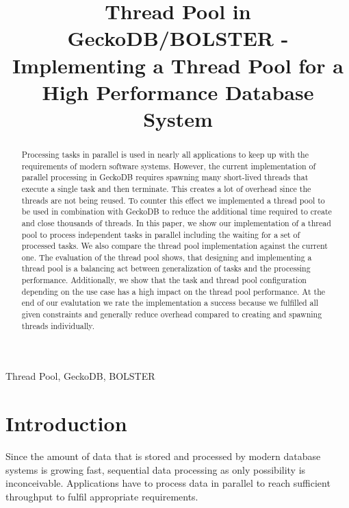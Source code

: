 \documentclass[conference]{IEEEtran}
\begin{document}
\title{Thread Pool in GeckoDB/BOLSTER - Implementing a Thread Pool for a High Performance Database System \\
}

\author{
	 \and
}

\maketitle

\begin{abstract}
        Processing tasks in parallel is used in nearly all applications to keep
        up with the requirements of modern software systems. However, the
        current implementation of parallel processing in GeckoDB requires
        spawning many short-lived threads that execute a single task and then
        terminate. This creates a lot of overhead since the threads are not
        being reused. To counter this effect we implemented a thread pool to be
        used in combination with GeckoDB to reduce the additional time required
        to create and close thousands of threads. In this paper, we show our
        implementation of a thread pool to process independent tasks in parallel
        including the waiting for a set of processed tasks. We also compare the
        thread pool implementation against the current one. The evaluation of
        the thread pool shows, that designing and implementing a thread pool is
        a balancing act between generalization of tasks and the processing
        performance. Additionally, we show that the task and thread pool configuration
        depending on the use case has a high impact on the thread
        pool performance. At the end of our evalutation we rate the implementation a
        success because we fulfilled all given constraints and generally reduce
        overhead compared to creating and spawning threads individually.
\end{abstract}

\begin{IEEEkeywords}
Thread Pool, GeckoDB, BOLSTER
\end{IEEEkeywords}

\section{Introduction}
Since the amount of data that is stored and processed by modern database systems is growing fast, sequential data processing as only possibility is inconceivable. Applications have to process data in parallel to reach sufficient throughput to fulfil appropriate requirements.
\end{document}

